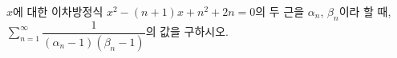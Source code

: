 $x$에 대한 이차방정식 $x^2-(n+1)x+n^2+2n=0$의 두 근을 $\alpha_n$, $\beta_n$이라 할 때, $\displaystyle\sum_{n=1}^{\infty}\dfrac{1}{(\alpha_n-1)(\beta_n-1)}$의 값을 구하시오.
